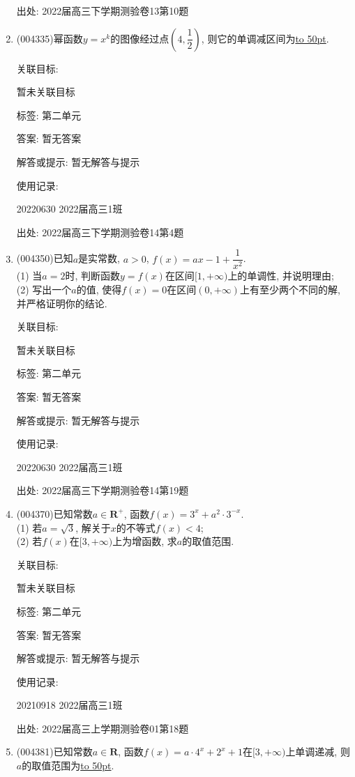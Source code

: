 \documentclass[10pt,a4paper]{article}
\newcommand{\blank}[1]{\underline{\hbox to #1pt{}}}
\begin{document}
\begin{enumerate}[1.]
出处: 2022届高三下学期测验卷13第10题
\item { (004335)}幂函数$y=x^k$的图像经过点$(4,\dfrac 12)$, 则它的单调减区间为\blank{50}.


关联目标:

暂未关联目标



标签: 第二单元

答案: 暂无答案

解答或提示: 暂无解答与提示

使用记录:

20220630	2022届高三1班	


出处: 2022届高三下学期测验卷14第4题
\item { (004350)}已知$a$是实常数, $a>0$, $f(x)=ax-1+\dfrac 1{x^2}$.\\
(1) 当$a=2$时, 判断函数$y=f(x)$在区间$[1,+\infty)$上的单调性, 并说明理由;\\
(2) 写出一个$a$的值, 使得$f(x)=0$在区间$(0,+\infty)$上有至少两个不同的解, 并严格证明你的结论.


关联目标:

暂未关联目标



标签: 第二单元

答案: 暂无答案

解答或提示: 暂无解答与提示

使用记录:

20220630	2022届高三1班		


出处: 2022届高三下学期测验卷14第19题
\item { (004370)}已知常数$a\in \mathbf{R}^+$, 函数$f(x)=3^x+a^2\cdot 3^{-x}$.\\
(1) 若$a=\sqrt 3$, 解关于$x$的不等式$f(x)<4$;\\
(2) 若$f(x)$在$[3,+\infty)$上为增函数, 求$a$的取值范围.


关联目标:

暂未关联目标



标签: 第二单元

答案: 暂无答案

解答或提示: 暂无解答与提示

使用记录:

20210918	2022届高三1班		


出处: 2022届高三上学期测验卷01第18题
\item { (004381)}已知常数$a\in \mathbf{R}$, 函数$f(x)=a\cdot 4^x+2^x+1$在$[3,+\infty)$上单调递减, 则$a$的取值范围为\blank{50}.



\end{enumerate}
\end{document}
